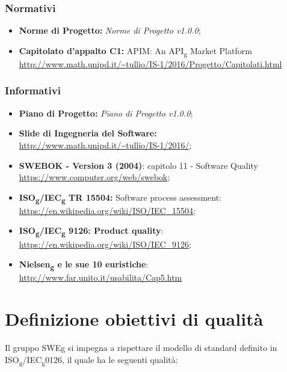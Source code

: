 \documentclass[12pt,a4paper,titlepage]{article}
\begin{document}
	\subsubsection{Normativi}
	\begin{itemize}
		\item \textbf{Norme di Progetto:} \textit{Norme di Progetto v1.0.0};
		\item \textbf{Capitolato d'appalto C1:} APIM: An API\textsubscript{g} Market Platform\\
			\textcolor{blue}{\url{http://www.math.unipd.it/~tullio/IS-1/2016/Progetto/Capitolati.html}}
	\end{itemize}
	\subsubsection{Informativi}
	\begin{itemize}
		\item \textbf{Piano di Progetto:} \textit{Piano di Progetto v1.0.0};
		\item \textbf{Slide di Ingegneria del Software:}\\ 
			\textcolor{blue}{\url{http://www.math.unipd.it/~tullio/IS-1/2016/}};
		\item \textbf{SWEBOK - Version 3 (2004)}: capitolo 11 - Software Quality\\
			\textcolor{blue}{\url{https://www.computer.org/web/swebok}};
		\item \textbf{ISO\textsubscript{g}/IEC\textsubscript{g} TR 15504:} Software process assessment:\\
			\textcolor{blue}{\url{https://en.wikipedia.org/wiki/ISO/IEC_15504}};
		\item \textbf{ISO\textsubscript{g}/IEC\textsubscript{g} 9126: Product quality}:\\
			\textcolor{blue}{\url{https://en.wikipedia.org/wiki/ISO/IEC_9126}};
		\item \textbf{Nielsen\textsubscript{g} e le sue 10 euristiche}: \\
			\textcolor{blue}{\url{http://www.far.unito.it/usabilita/Cap5.htm}}
	\end{itemize} 
	
	\section{Definizione obiettivi di qualità}
	Il gruppo SWEg si impegna a rispettare il modello di standard definito in ISO\textsubscript{g}/IEC\textsubscript{g}0126, il quale ha le seguenti qualità:
\end{document}
